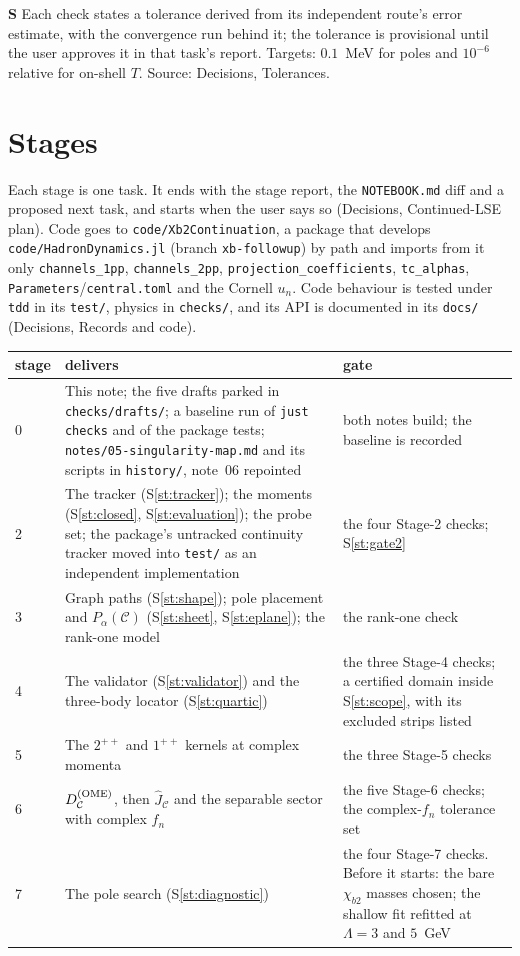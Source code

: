 \documentclass[11pt]{article}
\newcommand{\file}[1]{\nolinkurl{#1}}
\newcounter{stmt}
\newenvironment{stmt}[1]{\par\smallskip\refstepcounter{stmt}\noindent\textbf{S\thestmt}\enspace[\textsf{#1}]\enspace\ignorespaces}{\par\smallskip}
\newcommand{\Sr}[1]{S\ref{#1}}
\begin{document}
\begin{stmt}{definition}\label{st:tolerances}
Each check states a tolerance derived from its independent route's error estimate, with the convergence run behind it; the tolerance is provisional until the user approves it in that task's report. Targets: $0.1$~MeV for poles and $10^{-6}$ relative for on-shell $T$. Source: Decisions, Tolerances.
\end{stmt}

\section{Stages}\label{sec:stages}

Each stage is one task. It ends with the stage report, the \file{NOTEBOOK.md} diff and a proposed next task, and starts when the user says so (Decisions, Continued-LSE plan). Code goes to \file{code/Xb2Continuation}, a package that develops \file{code/HadronDynamics.jl} (branch \texttt{xb-followup}) by path and imports from it only \texttt{channels\_1pp}, \texttt{channels\_2pp}, \texttt{projection\_coefficients}, \texttt{tc\_alphas}, \texttt{Parameters}/\texttt{central.toml} and the Cornell $u_n$. Code behaviour is tested under \texttt{tdd} in its \texttt{test/}, physics in \file{checks/}, and its API is documented in its \texttt{docs/} (Decisions, Records and code).
\begin{xltabular}{\textwidth}{@{}lLL@{}}
\toprule
stage & delivers & gate\\
\midrule
{} & This note; the five drafts parked in \file{checks/drafts/}; a baseline run of \texttt{just checks} and of the package tests; \file{notes/05-singularity-map.md} and its scripts in \file{history/}, note~06 repointed & both notes build; the baseline is recorded\\
2 & The tracker (\Sr{st:tracker}); the moments (\Sr{st:closed}, \Sr{st:evaluation}); the probe set; the package's untracked continuity tracker moved into \texttt{test/} as an independent implementation & the four Stage-2 checks; \Sr{st:gate2}\\
3 & Graph paths (\Sr{st:shape}); pole placement and $P_\alpha(\mathcal C)$ (\Sr{st:sheet}, \Sr{st:eplane}); the rank-one model & the rank-one check\\
4 & The validator (\Sr{st:validator}) and the three-body locator (\Sr{st:quartic}) & the three Stage-4 checks; a certified domain inside \Sr{st:scope}, with its excluded strips listed\\
5 & The $2^{++}$ and $1^{++}$ kernels at complex momenta & the three Stage-5 checks\\
6 & $D^{\rm(OME)}_{\mathcal C}$, then $\hat J_{\mathcal C}$ and the separable sector with complex $f_n$ & the five Stage-6 checks; the complex-$f_n$ tolerance set\\
7 & The pole search (\Sr{st:diagnostic}) & the four Stage-7 checks. Before it starts: the bare $\chi_{b2}$ masses chosen; the shallow fit refitted at $\Lambda=3$ and $5$~GeV\\
\bottomrule
\end{xltabular}
\end{document}
